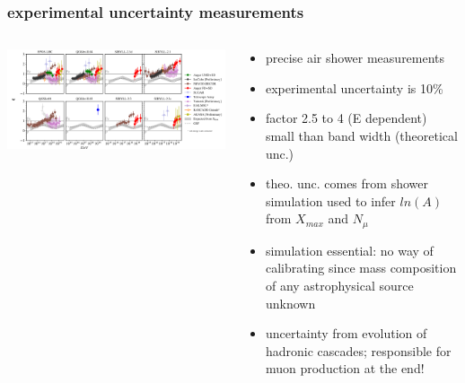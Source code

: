 \documentclass[aspectratio=1610, 9pt]{beamer}
\begin{document}
\begin{frame}\frametitle{experimental uncertainty measurements}
  \begin{columns}
    \begin{column}[c]{0.48\textwidth}
      \includegraphics{unc.png}
    \end{column}
    \begin{column}[c]{0.48\textwidth}
      \begin{itemize}
        \item precise air shower measurements
        \item experimental uncertainty is 10\%
        \item factor 2.5 to 4 (E dependent) small than band width (theoretical unc.)
        \item theo. unc. comes from shower simulation used to infer $ln(A)$ from $X_{max}$ and $N_{\mu}$
        \item simulation essential: no way of calibrating since mass composition of any astrophysical source unknown
        \item uncertainty from evolution of hadronic cascades; responsible for muon production at the end!
      \end{itemize}
    \end{column}
  \end{columns}
\end{frame}
\end{document}

